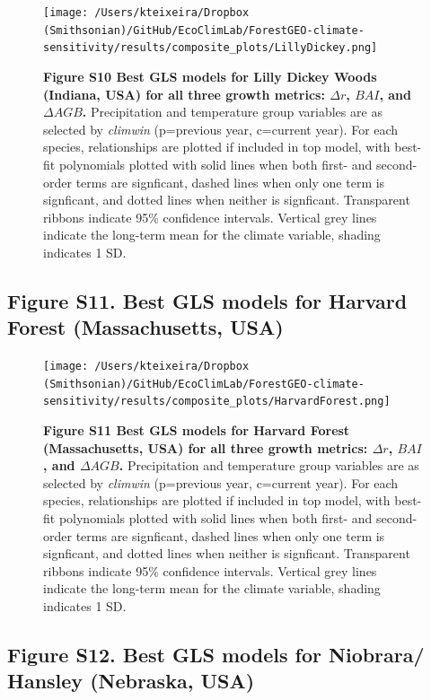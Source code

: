 \documentclass[
]{article}
\begin{document}
\begin{figure}
\centering
\texttt{[image: /Users/kteixeira/Dropbox (Smithsonian)/GitHub/EcoClimLab/ForestGEO-climate-sensitivity/results/composite\_plots/LillyDickey.png]}
\caption{\textbf{Figure S10 \textbar{} Best GLS models for Lilly Dickey
Woods (Indiana, USA) for all three growth metrics: \(\Delta r\),
\(BAI\), and \(\Delta AGB\).} Precipitation and temperature group
variables are as selected by \emph{climwin} (p=previous year, c=current
year). For each species, relationships are plotted if included in top
model, with best-fit polynomials plotted with solid lines when both
first- and second-order terms are signficant, dashed lines when only one
term is signficant, and dotted lines when neither is signficant.
Transparent ribbons indicate 95\% confidence intervals. Vertical grey
lines indicate the long-term mean for the climate variable, shading
indicates 1 SD.}
\end{figure}

\newpage

\hypertarget{figure-s11.-best-gls-models-for-harvard-forest-massachusetts-usa}{%
\subsection{Figure S11. Best GLS models for Harvard Forest
(Massachusetts,
USA)}\label{figure-s11.-best-gls-models-for-harvard-forest-massachusetts-usa}}

\begin{figure}
\centering
\texttt{[image: /Users/kteixeira/Dropbox (Smithsonian)/GitHub/EcoClimLab/ForestGEO-climate-sensitivity/results/composite\_plots/HarvardForest.png]}
\caption{\textbf{Figure S11 \textbar{} Best GLS models for Harvard
Forest (Massachusetts, USA) for all three growth metrics: \(\Delta r\),
\(BAI\), and \(\Delta AGB\).} Precipitation and temperature group
variables are as selected by \emph{climwin} (p=previous year, c=current
year). For each species, relationships are plotted if included in top
model, with best-fit polynomials plotted with solid lines when both
first- and second-order terms are signficant, dashed lines when only one
term is signficant, and dotted lines when neither is signficant.
Transparent ribbons indicate 95\% confidence intervals. Vertical grey
lines indicate the long-term mean for the climate variable, shading
indicates 1 SD.}
\end{figure}

\newpage

\hypertarget{figure-s12.-best-gls-models-for-niobrara-hansley-nebraska-usa}{%
\subsection{Figure S12. Best GLS models for Niobrara/ Hansley (Nebraska,
USA)}\label{figure-s12.-best-gls-models-for-niobrara-hansley-nebraska-usa}}
\end{document}
